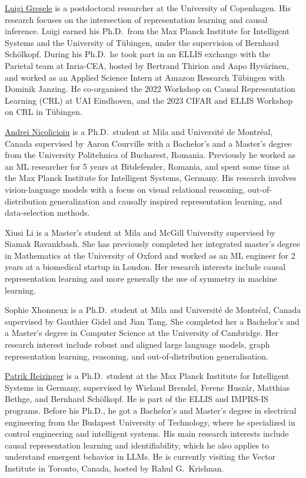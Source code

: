 \documentclass{article}
\begin{document}
\href{https://lgresele.github.io/}{Luigi Gresele}  is a postdoctoral researcher at the University of Copenhagen. His research focuses on the intersection of representation learning and causal inference. Luigi earned his Ph.D.\ from the Max Planck Institute for Intelligent Systems and the University of Tübingen, under the supervision of Bernhard Schölkopf. During his Ph.D.\, he took part in an ELLIS exchange with the Parietal team at Inria-CEA, hosted by Bertrand Thirion and Aapo Hyvärinen, and worked as an Applied Science Intern at Amazon Research Tübingen with Dominik Janzing. He co-organised the 2022 Workshop on Causal Representation Learning (CRL) at UAI Eindhoven, and the 2023 CIFAR and ELLIS Workshop on CRL in T\"ubingen.

\href{https://andreinicolicioiu.github.io/}{Andrei Nicolicioiu} is a Ph.D.\ student at Mila and Universit\'{e} de Montr\'{e}al, Canada supervised by Aaron Courville with a Bachelor’s and a Master’s degree from the University Politehnica of Bucharest, Romania. Previously he worked as an ML researcher for 5 years at Bitdefender, Romania, and spent some time at the Max Planck Institute for Intelligent Systems, Germany. His research involves vision-language models with a focus on visual relational reasoning, out-of-distribution generalization and causally inspired representation learning, and data-selection methods.

Xiusi Li is a Master's student at Mila and McGill University supervised by Siamak Ravankbash. She has previously completed her integrated master's degree in Mathematics at the University of Oxford and worked as an ML engineer for 2 years at a biomedical startup in London. Her research interests include causal representation learning and more generally the use of symmetry in machine learning.

Sophie Xhonneux is a Ph.D.\ student at Mila and Universit\'{e} de Montr\'{e}al, Canada supervised by Gauthier Gidel and Jian Tang. She completed her a Bachelor's and a Master's degree in Computer Science at the University of Cambridge. Her research interest include robust and aligned large language models, graph representation learning, reasoning, and out-of-distribution generalisation.


\href{https://rpatrik96.github.io/}{Patrik Reizinger} is a Ph.D.\ student at the Max Planck Institute for Intelligent Systems in Germany, supervised by Wieland Brendel, Ferenc Huszár, Matthias Bethge, and Bernhard Schölkopf. He is part of the ELLIS and IMPRS-IS programs. Before his Ph.D., he got a Bachelor's and Master's degree in electrical engineering from the Budapest University of Technology, where he specialized in control engineering and intelligent systems. His main research interests include causal representation learning and identifiability, which he also applies to understand emergent behavior in LLMs. He is currently visiting the Vector Institute in Toronto, Canada, hosted by Rahul G.~Krishnan.
\end{document}
